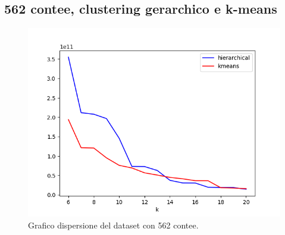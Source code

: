 \documentclass{article}
\begin{document}
\subsection*{562 contee, clustering gerarchico e k-means}

\begin{figure}[H]
	\hspace*{-1cm}\begin{minipage}{0.55\linewidth}
		\centering
         
    \end{minipage}
        \begin{minipage}{0.7\linewidth}
            \includegraphics[width=1.0\linewidth, valign=t]{figures/output212}
			\caption*{Grafico dispersione del dataset con 562 contee.}
		\end{minipage}
\end{figure}
\end{document}
